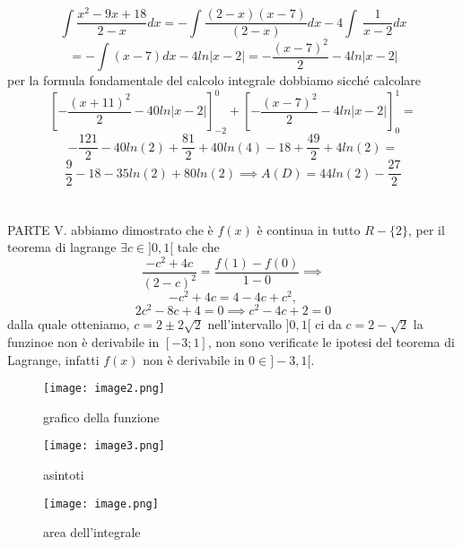 \documentclass{article}
\begin{document}
\\\\
\[
\int \frac{x^2 - 9x + 18}{2-x}dx = -\int \frac{(2-x)(x-7)}{(2-x)}dx  -4\int\ \frac{1}{x-2}dx
\]
\[
= -\int (x-7) dx - 4ln|x-2| = -\frac{(x-7)^2}{2} - 4ln|x-2|
\]
per la formula fondamentale del calcolo integrale dobbiamo sicché calcolare
\[
\left[ -\frac{(x+11)^2}{2} - 40ln|x-2|\right]_{-2}^0 + \left[ -\frac{(x-7)^2}{2} - 4ln|x-2|\right]_{0}^1 = 
\]
\[
-\frac{121}{2} - 40ln(2) + \frac{81}{2} + 40ln(4) -18 + \frac{49}{2} + 4ln(2) =
\]
\[
\frac{9}{2} - 18 - 35ln(2) + 80ln(2) \implies A(D) = 44ln(2) -\frac{27}{2}
\]
\\\\
PARTE V. abbiamo dimostrato che è $f(x)$ è continua in tutto $R-\{2\}$,  per il teorema di lagrange $\exists c \in ]0,1[$ tale che
\[
\frac{-c^2+4c}{(2-c)^2} = \frac{f(1)-f(0)}{1-0} \implies
\]
\[
-c^2 + 4c = 4 -4c + c^2, 
\]
\[
2c^2 -8c + 4 = 0 \implies c^2 - 4c + 2 = 0
\]
dalla quale otteniamo,
$c = 2\pm2\sqrt{2}$ nell'intervallo $]0,1[$ ci da $c = 2-\sqrt{2}$
la funzinoe non è derivabile in $[-3;1]$, non sono verificate le ipotesi del teorema di Lagrange, infatti $f(x)$ non è derivabile in $0 \in ]-3,1[$.
\begin{figure}
    \centering
    \texttt{[image: image2.png]}
    \caption{grafico della funzione}
    \label{fig:enter-label}
\end{figure}
\begin{figure}
    \centering
    \texttt{[image: image3.png]}
    \caption{asintoti}
    \label{fig:enter-label}
\end{figure}
\begin{figure}
    \centering
    \texttt{[image: image.png]}
    \caption{area dell'integrale}
    \label{fig:enter-label}
\end{figure}
\end{document}
